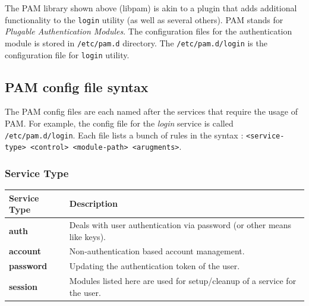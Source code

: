\noindent
The PAM library shown above (libpam) is akin to a plugin that adds additional functionality to the \verb|login| utility (as well as several others). PAM stands for \textit{Plugable Authentication Modules}. The configuration files for the authentication module is stored in \verb|/etc/pam.d| directory. The \verb|/etc/pam.d/login| is the configuration file for \verb|login| utility. 

\subsection{PAM config file syntax}
The PAM config files are each named after the services that require the usage of PAM. For example, the config file for the \textit{login} service is called \verb|/etc/pam.d/login|. Each file lists a bunch of rules in the syntax : \verb|<service-type> <control> <module-path> <arugments>|.

\subsubsection{Service Type}
\vspace{-10pt}
\begin{tabular}{ll}
	\toprule
	\textbf{Service Type} &\textbf{Description} \\
	\midrule
	\textbf{auth} &Deals with user authentication via password (or other means like keys). \\	
	\textbf{account} &Non-authentication based account management. \\	
	\textbf{password} &Updating the authentication token of the user. \\
	\textbf{session} &Modules listed here are used for setup/cleanup of a service for the user. \\
	\bottomrule
\end{tabular}

